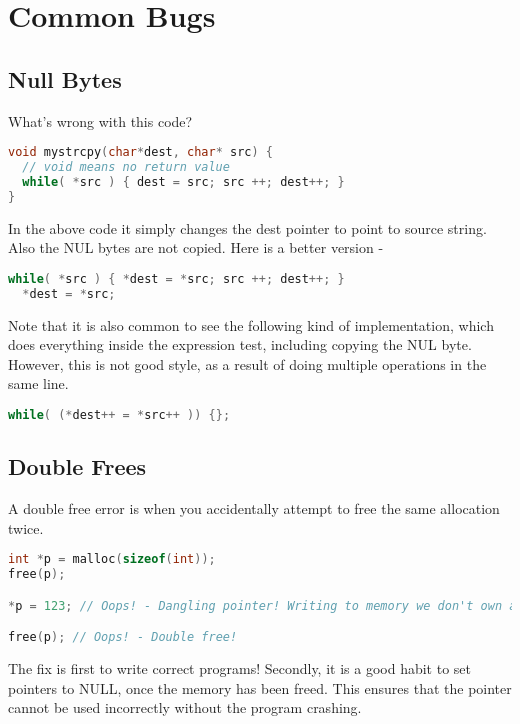 \section{Common Bugs}

\subsection{Null Bytes}

What's wrong with this code?

\begin{lstlisting}[language=C]
void mystrcpy(char*dest, char* src) {
  // void means no return value
  while( *src ) { dest = src; src ++; dest++; }
}
\end{lstlisting}

In the above code it simply changes the dest pointer to point to source string.
Also the NUL bytes are not copied.
Here is a better version -

\begin{lstlisting}[language=C]
  while( *src ) { *dest = *src; src ++; dest++; }
  *dest = *src;
\end{lstlisting}

Note that it is also common to see the following kind of implementation, which does everything inside the expression test, including copying the NUL byte.
However, this is not good style, as a result of doing multiple operations in the same line.

\begin{lstlisting}[language=C]
  while( (*dest++ = *src++ )) {};
\end{lstlisting}

\subsection{Double Frees}

A double free error is when you accidentally attempt to free the same allocation twice.

\begin{lstlisting}[language=C]
int *p = malloc(sizeof(int));
free(p);

*p = 123; // Oops! - Dangling pointer! Writing to memory we don't own anymore

free(p); // Oops! - Double free!
\end{lstlisting}

The fix is first to write correct programs!
Secondly, it is a good habit to set pointers to NULL, once the memory has been freed.
This ensures that the pointer cannot be used incorrectly without the program crashing.


